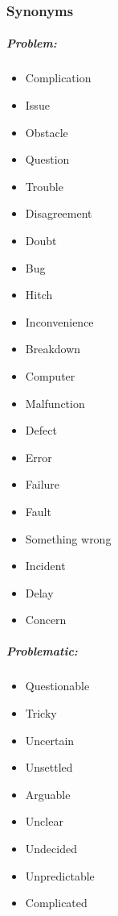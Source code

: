 \subsubsection{Synonyms}
\subparagraph{Problem:}
\begin{itemize}
\item Complication
\item Issue
\item Obstacle
\item Question
\item Trouble
\item Disagreement
\item Doubt
\item Bug
\item Hitch
\item Inconvenience
\item Breakdown
\item Computer
\item Malfunction
\item Defect
\item Error
\item Failure
\item Fault
\item Something wrong
\item Incident
\item Delay
\item Concern
\end{itemize}
 
\subparagraph{Problematic:}
\begin{itemize}
\item Questionable
\item Tricky
\item Uncertain
\item Unsettled
\item Arguable
\item Unclear
\item Undecided
\item Unpredictable
\item Complicated
\end{itemize}
